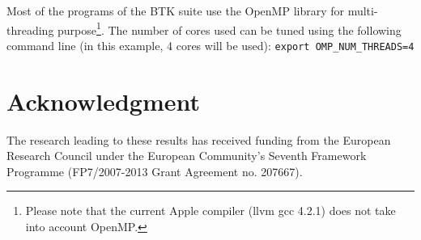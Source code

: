 \documentclass[a4paper,10pt]{article}
\begin{document}
Most of the programs of the BTK suite use the OpenMP library for multi-threading
purpose\footnote{Please note that the current Apple compiler (llvm gcc 4.2.1) does not take into account OpenMP.}. The number of cores used can be tuned using the following command line
(in this example, 4 cores will be used): \texttt{export OMP\_NUM\_THREADS=4}





\section*{Acknowledgment}
\small{The research leading to these results has received funding from the
European Research Council under the European Community’s Seventh Framework
Programme (FP7/2007-2013 Grant Agreement no. 207667).}



\end{document}
